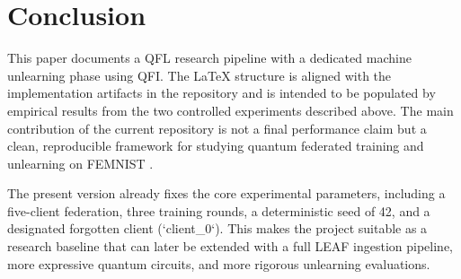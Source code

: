 \section{Conclusion}
\label{sec:conclusion}

This paper documents a QFL research pipeline with a dedicated machine unlearning phase using QFI. The LaTeX structure is aligned with the implementation artifacts in the repository and is intended to be populated by empirical results from the two controlled experiments described above. The main contribution of the current repository is not a final performance claim but a clean, reproducible framework for studying quantum federated training and unlearning on FEMNIST \cite{leaf,qfl_towards_2023,qfl_foundations_2023}.

The present version already fixes the core experimental parameters, including a five-client federation, three training rounds, a deterministic seed of 42, and a designated forgotten client (`client_0`). This makes the project suitable as a research baseline that can later be extended with a full LEAF ingestion pipeline, more expressive quantum circuits, and more rigorous unlearning evaluations.
